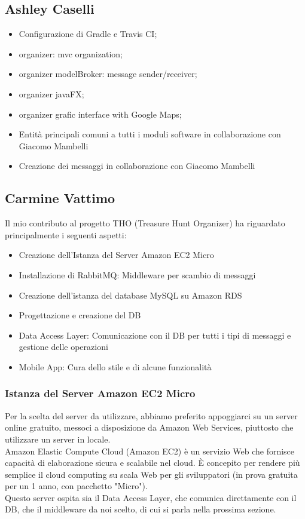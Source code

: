 \documentclass[12pt, italian]{article}
\begin{document}
\subsection{Ashley Caselli}
\begin{itemize}
	\item Configurazione di Gradle e Travis CI;
	\item organizer: mvc organization;
	\item organizer modelBroker: message sender/receiver;
	\item organizer javaFX;
	\item organizer grafic interface with Google Maps;
	\item Entità principali comuni a tutti i moduli software in collaborazione con Giacomo Mambelli
	\item Creazione dei messaggi in collaborazione con Giacomo Mambelli
\end{itemize}
\subsection{Carmine Vattimo}
Il mio contributo al progetto THO (Treasure Hunt Organizer) ha riguardato principalmente i seguenti aspetti:
\begin{itemize}
	\item Creazione dell'Istanza del Server Amazon EC2 Micro
	\item Installazione di RabbitMQ: Middleware per scambio di messaggi
	\item Creazione dell'istanza del database MySQL su Amazon RDS
	\item Progettazione e creazione del DB
	\item Data Access Layer: Comunicazione con il DB per tutti i tipi di messaggi e gestione delle operazioni
	\item Mobile App: Cura dello stile e di alcune funzionalità
\end{itemize}
\subsubsection{Istanza del Server Amazon EC2 Micro}
Per la scelta del server da utilizzare, abbiamo preferito appoggiarci su un server online gratuito, messoci a disposizione da Amazon Web Services, piuttosto che utilizzare un server in locale.\\
Amazon Elastic Compute Cloud (Amazon EC2) è un servizio Web che fornisce capacità di elaborazione sicura e scalabile nel cloud. È concepito per rendere più semplice il cloud computing su scala Web per gli sviluppatori (in prova gratuita per un 1 anno, con pacchetto "Micro").\\
Questo server ospita sia il Data Access Layer, che comunica direttamente con il DB, che il middleware da noi scelto, di cui si parla nella prossima sezione.
\end{document}
